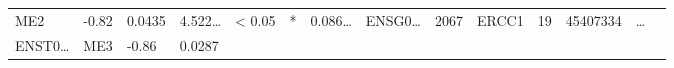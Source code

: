 \documentclass[
]{article}
\begin{document}
\begin{longtable}[]{@{}llllllllllllll@{}}
\begin{minipage}[t]{0.04\columnwidth}
ME2\strut
\end{minipage} & \begin{minipage}[t]{0.04\columnwidth}\raggedright
-0.82\strut
\end{minipage} & \begin{minipage}[t]{0.04\columnwidth}\raggedright
0.0435\strut
\end{minipage} & \begin{minipage}[t]{0.05\columnwidth}\raggedright
4.522\ldots{}\strut
\end{minipage} & \begin{minipage}[t]{0.05\columnwidth}\raggedright
\textless{} 0.05\strut
\end{minipage} & \begin{minipage}[t]{0.03\columnwidth}\raggedright
*\strut
\end{minipage} & \begin{minipage}[t]{0.05\columnwidth}\raggedright
0.086\ldots{}\strut
\end{minipage} & \begin{minipage}[t]{0.05\columnwidth}\raggedright
ENSG0\ldots{}\strut
\end{minipage} & \begin{minipage}[t]{0.05\columnwidth}\raggedright
2067\strut
\end{minipage} & \begin{minipage}[t]{0.05\columnwidth}\raggedright
ERCC1\strut
\end{minipage} & \begin{minipage}[t]{0.05\columnwidth}\raggedright
19\strut
\end{minipage} & \begin{minipage}[t]{0.05\columnwidth}\raggedright
45407334\strut
\end{minipage} & \begin{minipage}[t]{0.02\columnwidth}\raggedright
\ldots{}\strut
\end{minipage}\tabularnewline
\begin{minipage}[t]{0.05\columnwidth}\raggedright
ENST0\ldots{}\strut
\end{minipage} & \begin{minipage}[t]{0.04\columnwidth}\raggedright
ME3\strut
\end{minipage} & \begin{minipage}[t]{0.04\columnwidth}\raggedright
-0.86\strut
\end{minipage} & \begin{minipage}[t]{0.04\columnwidth}\raggedright
0.0287\strut

\end{minipage}
\end{longtable}
\end{document}
